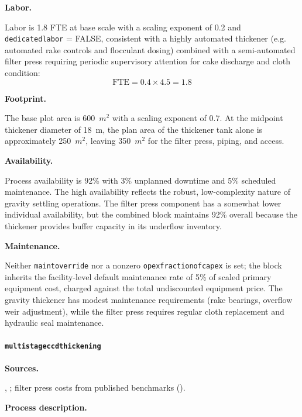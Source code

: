 \documentclass{article}
\renewcommand\_{\textunderscore\allowbreak}
\begin{document}
\medskip
\noindent\textbf{Labor.}\quad

Labor is 1.8 FTE at base scale with a scaling exponent of 0.2 and \texttt{dedicated\_labor} = FALSE, consistent with a highly automated thickener (e.g. automated rake controls and flocculant dosing) combined with a semi-automated filter press requiring periodic supervisory attention for cake discharge and cloth condition:
\[
	\text{FTE} = 0.4 \times 4.5 = 1.8
\]

\medskip
\noindent\textbf{Footprint.}\quad

The base plot area is 600~$\si{m^2}$ with a scaling exponent of 0.7. At the midpoint thickener diameter of 18~m, the plan area of the thickener tank alone is approximately 250~$\si{m^2}$, leaving 350~$\si{m^2}$ for the filter press, piping, and access.

\medskip
\noindent\textbf{Availability.}\quad

Process availability is 92\% with 3\% unplanned downtime and 5\% scheduled maintenance. The high availability reflects the robust, low-complexity nature of gravity settling operations. The filter press component has a somewhat lower individual availability, but the combined block maintains 92\% overall because the thickener provides buffer capacity in its underflow inventory.

\medskip
\noindent\textbf{Maintenance.}\quad

Neither \texttt{maint\_override} nor a nonzero \texttt{opex\_fraction\_of\_capex} is set; the block inherits the facility-level default maintenance rate of 5\% of scaled primary equipment cost, charged against the total undiscounted equipment price. The gravity thickener has modest maintenance requirements (rake bearings, overflow weir adjustment), while the filter press requires regular cloth replacement and hydraulic seal maintenance.

\clearpage
\paragraph{\texttt{multi\_stage\_ccd\_thickening}}\label{app:04-methods-blockdefs-ccd}\leavevmode\par

\medskip
\noindent\textbf{Sources.}\quad

\citet{sgscanadaincSK1300Technical2024}, \citet{mularCAPCOSTSHandbookEstimating1998}; filter press costs from published benchmarks (\citet{porvooIndustrialFilterPress2025}). 

\medskip
\noindent\textbf{Process description.}\quad
\end{document}

